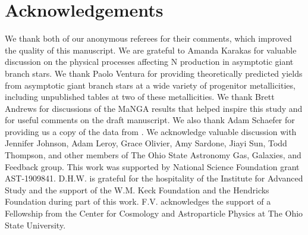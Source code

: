 \documentclass[ms.tex]{subfiles}
\begin{document}
\section{Acknowledgements}
\label{sec:acknowledgements}

We thank both of our anonymous referees for their comments, which improved the
quality of this manuscript.
We are grateful to Amanda Karakas for valuable discussion on the physical
processes affecting N production in asymptotic giant branch stars.
We thank Paolo Ventura for providing theoretically predicted yields from
asymptotic giant branch stars at a wide variety of progenitor metallicities,
including unpublished tables at two of these metallicities.
We thank Brett Andrews for discussions of the MaNGA results that helped inspire
this study and for useful comments on the draft manuscript.
We also thank Adam Schaefer for providing us a copy of the data from
\citet{Schaefer2020}.
We acknowledge valuable discussion with Jennifer Johnson, Adam Leroy, Grace
Olivier, Amy Sardone, Jiayi Sun, Todd Thompson, and other members of The Ohio
State Astronomy Gas, Galaxies, and Feedback group.
This work was supported by National Science Foundation grant AST-1909841.
D.H.W. is grateful for the hospitality of the Institute for Advanced Study and
the support of the W.M. Keck Foundation and the Hendricks Foundation during
part of this work.
F.V. acknowledges the support of a Fellowship from the Center for Cosmology and
Astroparticle Physics at The Ohio State University.
\end{document}
